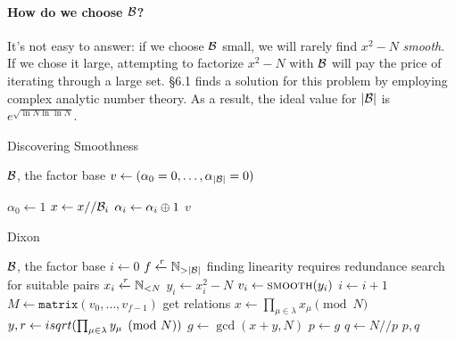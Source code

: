 \paragraph{How do we choose $\mathcal{B}$?}
It's not easy to answer: if we choose $\mathcal{B}$ small, we will rarely find
$x^2 -N$ \emph{smooth}. If we chose it large, attempting to factorize $x^2 -N$
with $\mathcal{B}$ will pay the price of iterating through a large set.
\cite{Crandall} \S 6.1 finds a solution for this problem by employing complex
analytic number theory.
 As a  result, the ideal value for $|\mathcal{B}|$ is
$e^{\sqrt{\ln N \ln \ln N}}$.


\begin{algorithm}
  \caption{Discovering Smoothness}
  \begin{algorithmic}[1]
    \Require $\mathcal{B}$, the factor base
      \State $v \gets (\alpha_0 = 0, \ldots, \alpha_{|\mathcal{B}|} = 0)$

       $\alpha_0 \gets 1$ \EndIf
          \State $x \gets x// \mathcal{B}_i$
          \State $\alpha_i \gets \alpha_i \oplus 1$
        \EndWhile
      \EndFor
        \State \Return $v$
      \Else
        \State \Return {}
      \EndIf
    \EndProcedure
  \end{algorithmic}
\end{algorithm}

\begin{algorithm}
  \caption{Dixon}
  \begin{algorithmic}[1]
    \Require $\mathcal{B}$, the factor base
    \State $i \gets 0$
    \State $f \xleftarrow{r} \mathbb{N}_{ > |\mathcal{B}|}$
    \Comment finding linearity requires redundance
    \Comment search for suitable pairs
    \State $x_i \xleftarrow{r} \mathbb{N}_{< N}$
    \State $y_i \gets x_i^2 - N$
    \State $v_i \gets \textsc{smooth}(y_i)$
     $i \gets i+1$ \EndIf
  \EndWhile
  \State $M \gets \texttt{matrix}(v_0, \ldots, v_{f-1})$
    \Comment get relations
    \State $x \gets \prod_{\mu \in \lambda} x_\mu \pmod{N}$
    \State $y, r \gets isqrt(\prod_{\mu \in \lambda} y_\mu \pmod{N})$
    \State $g  \gets \gcd(x+y, N)$
      \State $p \gets g $
      \State $q \gets N//p$
      \State \Return $p, q$
    \EndIf
  \EndFor
  \EndFunction
  \end{algorithmic}
\end{algorithm}

